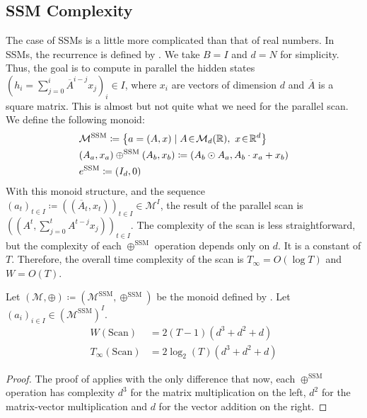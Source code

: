 \documentclass{article}
\begin{document}
\subsection{SSM Complexity}
\label{app:SSM_complexity}
The case of SSMs is a little more complicated than that of real numbers. In SSMs, the recurrence is defined by . We take $B = I$ and $d = N$ for simplicity. Thus, the goal is to compute in parallel the hidden states $(h_i = \sum_{j=0}^i\overline{A}^{i-j}x_j)_i\in I$, where $x_i$ are vectors of dimension $d$ and $\overline{A}$ is a square matrix. This is almost but not quite what we need for the parallel scan. We define the following monoid:
\begin{align}
\label{eq:M_SSM}
    &\mathcal{M}^{\mathrm{SSM}}\coloneqq \left\{a = (A, x)\mid A\!\in\!\mathcal{M}_{d}(\mathbb{R}),~x\!\in\!\mathbb{R}^d\right\}\\
\label{eq:+_SSM}
    &(A_a, x_a) \oplus^{\mathrm{SSM}} (A_b,x_b)\coloneqq (A_b \odot A_a, A_b \cdot x_a + x_b)\\
\label{eq:0_SSM}
    &e^{\mathrm{SSM}}\coloneqq(I_d, 0)
\end{align}
With this monoid structure, and the sequence $(a_t)_{t\in I} \coloneqq ((\overline{A}_t, x_t))_{t\in I} \in \mathcal{M}^I$, the result of the parallel scan is $((A^t, \sum_{j=0}^tA^{t-j}x_j))_{t\in I}$. The complexity of the scan is less straightforward, but the complexity of each $\oplus^{\mathrm{SSM}}$ operation depends only on $d$. It is a constant of $T$. Therefore, the overall time complexity of the scan is $T_\infty= O(\log T)$ and $W=O(T)$.
\begin{proposition}
    Let $(\mathcal{M}, \oplus) \coloneqq (\mathcal{M}^{\mathrm{SSM}}, \oplus^{\mathrm{SSM}})$ be the monoid defined by . Let $(a_i)_{i\in I}\in (\mathcal{M}^{\mathrm{SSM}})^I$.
\begin{align}
    W(\mathrm{Scan})&= 2(T-1)(d^3+d^2+d)\\
    T_\infty(\mathrm{Scan})&= 2\log_2 (T) (d^3+d^2+d)
\end{align}
\end{proposition}
\begin{proof}
The proof of  applies with the only difference that now, each $\oplus^{\mathrm{SSM}}$ operation has complexity $d^3$ for the matrix multiplication on the left, $d^2$ for the matrix-vector multiplication and $d$ for the vector addition on the right.
\end{proof}
\end{document}
